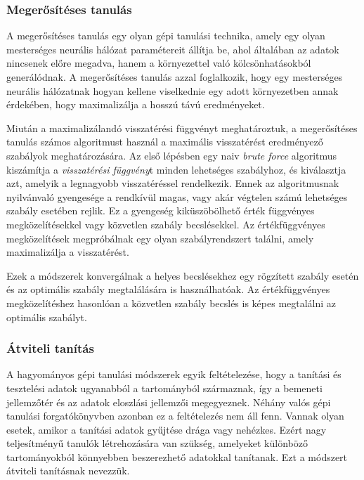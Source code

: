 \documentclass[12pt,a4]{article}
\begin{document}
	\subsubsection{Megerősítéses tanulás}
	
	A megerősítéses tanulás egy olyan gépi tanulási technika, amely egy olyan
	mesterséges neurális hálózat paramétereit állítja be, ahol általában az adatok nincsenek előre megadva, hanem a környezettel való kölcsönhatásokból generálódnak. A megerősítéses tanulás azzal foglalkozik, hogy egy mesterséges neurális hálózatnak hogyan kellene viselkednie egy adott környezetben annak érdekében, hogy maximalizálja a hosszú távú 
	eredményeket.
	
	Miután a maximalizálandó visszatérési függvényt meghatároztuk, a megerősítéses tanulás számos algoritmust használ a maximális visszatérést eredményező szabályok meghatározására. Az első lépésben egy naiv \textit{brute force} algoritmus kiszámítja a \textit{visszatérési függvény}t minden lehetséges szabályhoz, és kiválasztja azt, amelyik a legnagyobb visszatéréssel rendelkezik. Ennek az algoritmusnak nyilvánvaló gyengesége a rendkívül magas, vagy akár végtelen számú lehetséges szabály esetében rejlik. Ez a gyengeség kiküszöbölhető érték függvényes megközelítésekkel vagy közvetlen szabály becslésekkel. Az értékfüggvényes megközelítések megpróbálnak
	egy olyan szabályrendszert találni, amely maximalizálja a visszatérést.
	
	Ezek a módszerek konvergálnak a helyes becslésekhez egy rögzített szabály esetén és az optimális szabály megtalálására is használhatóak. Az értékfüggvényes megközelítéshez hasonlóan a közvetlen szabály becslés is képes megtalálni az optimális szabályt.

    \subsubsection{Átviteli tanítás}
    
     \cite{tl}A hagyományos gépi tanulási módszerek egyik feltételezése, hogy a tanítási és tesztelési adatok ugyanabból a tartományból származnak, így a bemeneti jellemzőtér és az adatok eloszlási jellemzői megegyeznek. Néhány valós gépi tanulási forgatókönyvben azonban ez a feltételezés nem áll fenn. Vannak olyan esetek, amikor a tanítási adatok gyűjtése drága vagy nehézkes. Ezért nagy teljesítményű tanulók létrehozására van szükség, amelyeket különböző tartományokból könnyebben beszerezhető adatokkal tanítanak. Ezt a módszert átviteli tanításnak nevezzük.
\end{document}
